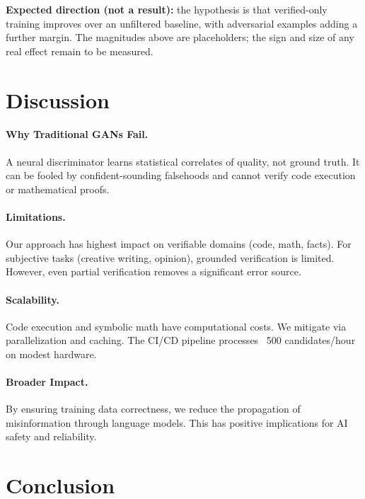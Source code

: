 \documentclass[11pt,a4paper]{article}
\begin{document}
\textbf{Expected direction (not a result):} the hypothesis is that verified-only training improves over an unfiltered baseline, with adversarial examples adding a further margin. The magnitudes above are placeholders; the sign and size of any real effect remain to be measured.

\section{Discussion}
\label{sec:discussion}

\paragraph{Why Traditional GANs Fail.}
A neural discriminator learns statistical correlates of quality, not ground truth. It can be fooled by confident-sounding falsehoods and cannot verify code execution or mathematical proofs.

\paragraph{Limitations.}
Our approach has highest impact on verifiable domains (code, math, facts). For subjective tasks (creative writing, opinion), grounded verification is limited. However, even partial verification removes a significant error source.

\paragraph{Scalability.}
Code execution and symbolic math have computational costs. We mitigate via parallelization and caching. The CI/CD pipeline processes ~500 candidates/hour on modest hardware.

\paragraph{Broader Impact.}
By ensuring training data correctness, we reduce the propagation of misinformation through language models. This has positive implications for AI safety and reliability.

\section{Conclusion}
\label{sec:conclusion}
\end{document}
